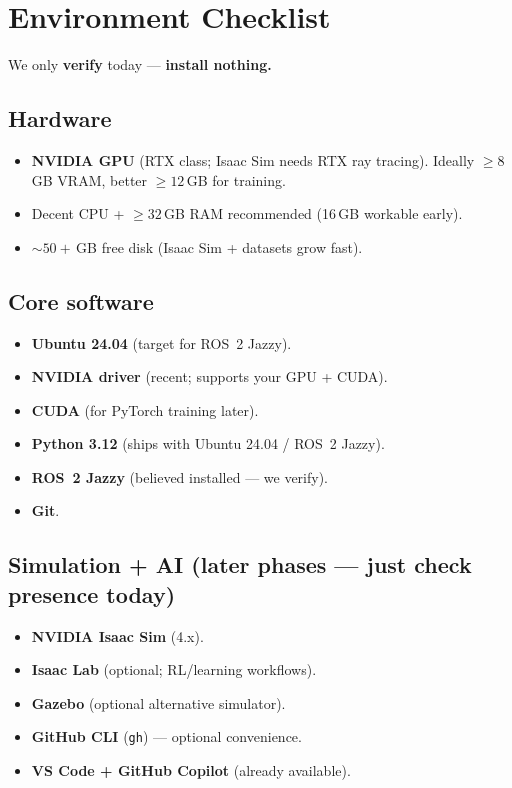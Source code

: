 \documentclass[11pt]{article}
\begin{document}
\section{Environment Checklist}

We only \textbf{verify} today --- \textbf{install nothing.}

\subsection{Hardware}
\begin{itemize}[leftmargin=*, label=$\square$]
  \item \textbf{NVIDIA GPU} (RTX class; Isaac Sim needs RTX ray tracing).
  Ideally $\geq 8$\,GB VRAM, better $\geq 12$\,GB for training.
  \item Decent CPU + $\geq 32$\,GB RAM recommended (16\,GB workable early).
  \item ${\sim}50+$\,GB free disk (Isaac Sim + datasets grow fast).
\end{itemize}

\subsection{Core software}
\begin{itemize}[leftmargin=*, label=$\square$]
  \item \textbf{Ubuntu 24.04} (target for ROS~2 Jazzy).
  \item \textbf{NVIDIA driver} (recent; supports your GPU + CUDA).
  \item \textbf{CUDA} (for PyTorch training later).
  \item \textbf{Python 3.12} (ships with Ubuntu 24.04 / ROS~2 Jazzy).
  \item \textbf{ROS~2 Jazzy} (believed installed --- we verify).
  \item \textbf{Git}.
\end{itemize}

\subsection{Simulation + AI (later phases --- just check presence today)}
\begin{itemize}[leftmargin=*, label=$\square$]
  \item \textbf{NVIDIA Isaac Sim} (4.x).
  \item \textbf{Isaac Lab} (optional; RL/learning workflows).
  \item \textbf{Gazebo} (optional alternative simulator).
  \item \textbf{GitHub CLI} (\texttt{gh}) --- optional convenience.
  \item \textbf{VS Code + GitHub Copilot} (already available).
\end{itemize}
\end{document}
